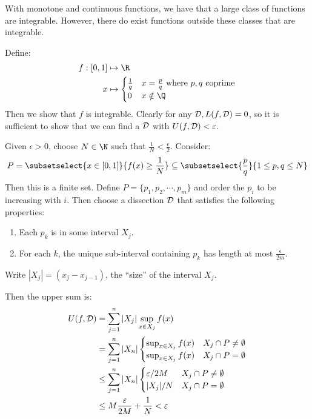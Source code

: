 \documentclass[../Main.tex]{subfiles}
\begin{document}
\begin{remark}
    With monotone and continuous functions, we have that a large class of functions are integrable. However, there do exist functions outside these classes that are integrable.
\end{remark}
\begin{example}
    Define:
    \begin{align*}
        f : [0, 1] &\mapsto \R \\
        x &\mapsto
        \begin{cases}
            \frac{1}{q} & x = \frac{p}{q} \text{ where } p, q \text{ coprime} \\
            0 & x \notin \Q
        \end{cases}
    \end{align*}
    Then we show that $f$ is integrable. Clearly for any $\mathcal{D}, L(f, \mathcal{D}) = 0$, so it is sufficient to show that we can find a $\mathcal{D}$ with $U(f, \mathcal{D}) < \varepsilon$.

    Given $\epsilon > 0$, choose $N \in \N$ such that $\frac{1}{N} < \frac{\epsilon}{2}$. Consider:
    \begin{equation*}
        P = \subsetselect{x \in [0, 1]}{f(x) \geq \frac{1}{N}} \subseteq \subsetselect{\frac{p}{q}}{1 \leq p, q \leq N}
    \end{equation*}
    Then this is a finite set. Define $P = \{p_1, p_2, \cdots, p_m\}$ and order the $p_i$ to be increasing with $i$. Then choose a dissection $\mathcal{D}$ that satisfies the following properties:
    \begin{enumerate}
        \item Each $p_k$ is in some interval $X_j$.
        \item For each $k$, the unique sub-interval containing $p_k$ has length at most $\frac{\epsilon}{2m}$.
    \end{enumerate}
    Write $|X_j| = (x_j - x_{j-1})$, the ``size'' of the interval $X_j$.

    Then the upper sum is:
    \begin{align*}
        U(f, \mathcal{D}) &= \sum_{j = 1}^n |X_j| \sup_{x \in X_j} f(x) \\
        &= \sum_{j=1}^n |X_n|
        \begin{cases}
            \sup_{x \in X_j} f(x) & X_j \cap P \neq \emptyset \\
            \sup_{x \in X_j} f(x) & X_j \cap P = \emptyset
        \end{cases} \\
        &\leq \sum_{j=1}^n |X_n|
        \begin{cases}
            \varepsilon / 2M & X_j \cap P \neq \emptyset \\
            |X_j| / N & X_j \cap P = \emptyset
        \end{cases} \\
        &\leq M \frac{\varepsilon}{2M} + \frac{1}{N} < \varepsilon
    \end{align*}
\end{example}
\end{document}
